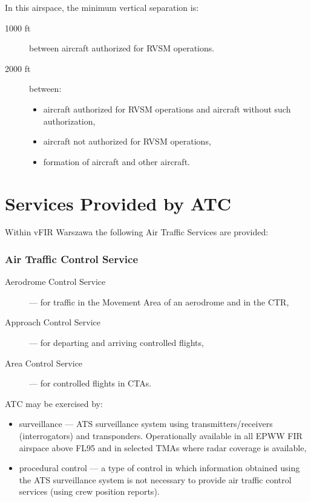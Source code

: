 In this airspace, the minimum vertical separation is:
\begin{description}
	\item[1000 ft] between aircraft authorized for RVSM operations.
	\item[2000 ft] between:
	      \begin{itemize}
		      \item aircraft authorized for RVSM operations and aircraft without such authorization,
		      \item aircraft not authorized for RVSM operations,
		      \item formation of aircraft and other aircraft.
	      \end{itemize}
\end{description}

\clearpage%
\section{Services Provided by ATC}%
\label{sect:airspace:services}

Within vFIR Warszawa the following Air Traffic Services are provided:
\subsubsection{Air Traffic Control Service}
\begin{description}
	\item[Aerodrome Control Service] --- for traffic in the Movement Area of an aerodrome and in the CTR,
	\item[Approach Control Service] --- for departing and arriving controlled flights,
	\item[Area Control Service] --- for controlled flights in CTAs.
\end{description}

ATC may be exercised by:
\begin{itemize}
	\item surveillance --- ATS surveillance system using transmitters/receivers (interrogators) and transponders. Operationally available in all EPWW FIR airspace above FL95 and in selected TMAs where radar coverage is available,
	\item procedural control --- a type of control in which information obtained using the ATS surveillance system is not necessary to provide air traffic control services (using crew position reports).
\end{itemize}

